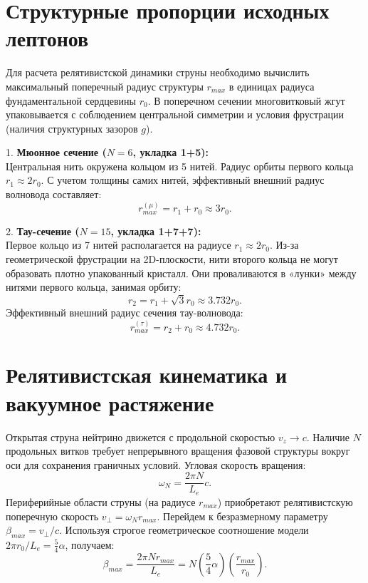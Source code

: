 \documentclass[12pt,a4paper]{article}
\begin{document}
	\section{Структурные пропорции исходных лептонов}
	
	Для расчета релятивистской динамики струны необходимо вычислить максимальный поперечный радиус структуры $r_{max}$ в единицах радиуса фундаментальной сердцевины $r_0$.
	В поперечном сечении многовитковый жгут упаковывается с соблюдением центральной симметрии и условия фрустрации (наличия структурных зазоров $g$). 
	
	1. \textbf{Мюонное сечение ($N=6$, укладка 1+5):}\\
	Центральная нить окружена кольцом из 5 нитей. Радиус орбиты первого кольца $r_1 \approx 2r_0$. С учетом толщины самих нитей, эффективный внешний радиус волновода составляет:
	\begin{equation}
		r_{max}^{(\mu)} = r_1 + r_0 \approx 3 r_0.
	\end{equation}
	
	2. \textbf{Тау-сечение ($N=15$, укладка 1+7+7):}\\
	Первое кольцо из 7 нитей располагается на радиусе $r_1 \approx 2r_0$. Из-за геометрической фрустрации на 2D-плоскости, нити второго кольца не могут образовать плотно упакованный кристалл. Они проваливаются в «лунки» между нитями первого кольца, занимая орбиту:
	\begin{equation}
		r_2 = r_1 + \sqrt{3}r_0 \approx 3.732 r_0.
	\end{equation}
	Эффективный внешний радиус сечения тау-волновода:
	\begin{equation}
		r_{max}^{(\tau)} = r_2 + r_0 \approx 4.732 r_0.
	\end{equation}
	
	\section{Релятивистская кинематика и вакуумное растяжение}
	
	Открытая струна нейтрино движется с продольной скоростью $v_z \to c$. Наличие $N$ продольных витков требует непрерывного вращения фазовой структуры вокруг оси для сохранения граничных условий. Угловая скорость вращения:
	\begin{equation}
		\omega_N = \frac{2\pi N}{L_e} c.
	\end{equation}
	Периферийные области струны (на радиусе $r_{max}$) приобретают релятивистскую поперечную скорость $v_\perp = \omega_N r_{max}$. Перейдем к безразмерному параметру $\beta_{max} = v_\perp / c$. Используя строгое геометрическое соотношение модели $2\pi r_0 / L_e = \frac{5}{4}\alpha$, получаем:
	\begin{equation}
		\beta_{max} = \frac{2\pi N r_{max}}{L_e} = N \left( \frac{5}{4}\alpha \right) \left( \frac{r_{max}}{r_0} \right).
	\end{equation}
	
\end{document}
